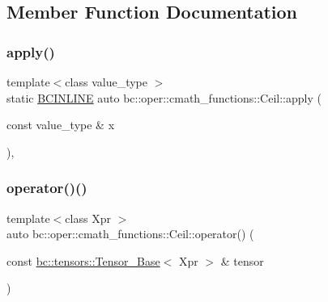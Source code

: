 \subsection{Member Function Documentation}
\mbox{\label{structbc_1_1oper_1_1cmath__functions_1_1Ceil_ae7414a021751685ffe1acd8a3f4f89f5}} 
\subsubsection{\texorpdfstring{apply()}{apply()}}
{\footnotesize\ttfamily template$<$class value\+\_\+type $>$ \\
static \hyperlink{common_8h_a6699e8b0449da5c0fafb878e59c1d4b1}{B\+C\+I\+N\+L\+I\+NE} auto bc\+::oper\+::cmath\+\_\+functions\+::\+Ceil\+::apply (\begin{DoxyParamCaption}\item[{const value\+\_\+type \&}]{x }\end{DoxyParamCaption})\hspace{0.3cm}{\ttfamily [inline]}, {\ttfamily [static]}}

\mbox{\label{structbc_1_1oper_1_1cmath__functions_1_1Ceil_a76594ed82676bc601f2c293c2872b095}} 
\subsubsection{\texorpdfstring{operator()()}{operator()()}\hspace{0.1cm}{\footnotesize\ttfamily [1/3]}}
{\footnotesize\ttfamily template$<$class Xpr $>$ \\
auto bc\+::oper\+::cmath\+\_\+functions\+::\+Ceil\+::operator() (\begin{DoxyParamCaption}\item[{const \hyperlink{classbc_1_1tensors_1_1Tensor__Base}{bc\+::tensors\+::\+Tensor\+\_\+\+Base}$<$ Xpr $>$ \&}]{tensor }\end{DoxyParamCaption})\hspace{0.3cm}{\ttfamily [inline]}}

